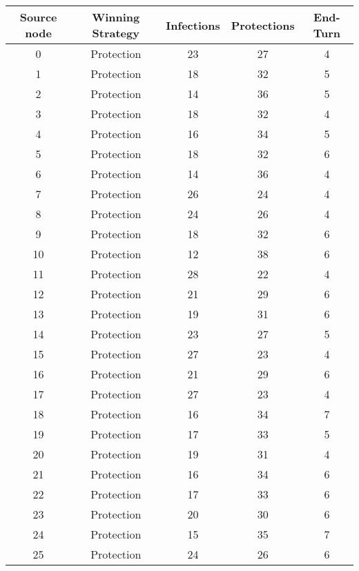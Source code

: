 \documentclass[results.tex]{subfiles}
\begin{document}
\begin{center}
  \begin{tabular}{| c || c | c | c | c |}
    \hline
    {\bfseries Source node} & {\bfseries Winning Strategy} & {\bfseries Infections} & {\bfseries Protections} & {\bfseries End-Turn} \\  %
    \hline\hline
    0 & Protection & 23 & 27 & 4 \\ 
    \hline
    1 & Protection & 18 & 32 & 5 \\ 
    \hline
    2 & Protection & 14 & 36 & 5 \\ 
    \hline
    3 & Protection & 18 & 32 & 4 \\ 
    \hline
    4 & Protection & 16 & 34 & 5 \\ 
    \hline
    5 & Protection & 18 & 32 & 6 \\ 
    \hline
    6 & Protection & 14 & 36 & 4 \\ 
    \hline
    7 & Protection & 26 & 24 & 4 \\ 
    \hline
    8 & Protection & 24 & 26 & 4 \\ 
    \hline
    9 & Protection & 18 & 32 & 6 \\ 
    \hline
    10 & Protection & 12 & 38 & 6 \\ 
    \hline
    11 & Protection & 28 & 22 & 4 \\ 
    \hline
    12 & Protection & 21 & 29 & 6 \\ 
    \hline
    13 & Protection & 19 & 31 & 6 \\ 
    \hline
    14 & Protection & 23 & 27 & 5 \\ 
    \hline
    15 & Protection & 27 & 23 & 4 \\ 
    \hline
    16 & Protection & 21 & 29 & 6 \\ 
    \hline
    17 & Protection & 27 & 23 & 4 \\ 
    \hline
    18 & Protection & 16 & 34 & 7 \\ 
    \hline
    19 & Protection & 17 & 33 & 5 \\ 
    \hline
    20 & Protection & 19 & 31 & 4 \\ 
    \hline
    21 & Protection & 16 & 34 & 6 \\ 
    \hline
    22 & Protection & 17 & 33 & 6 \\ 
    \hline
    23 & Protection & 20 & 30 & 6 \\ 
    \hline
    24 & Protection & 15 & 35 & 7 \\ 
    \hline
    25 & Protection & 24 & 26 & 6 \\ 

\end{tabular}
\end{center}
\end{document}
